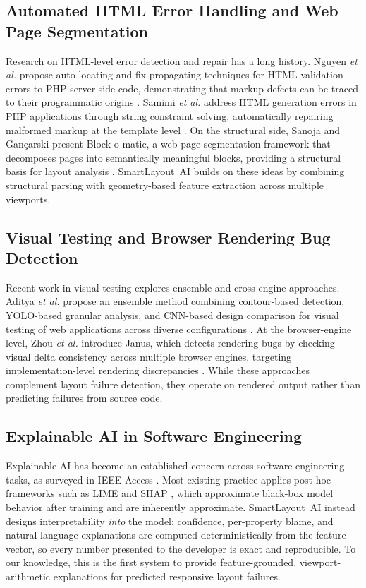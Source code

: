 \documentclass[conference]{IEEEtran}
\begin{document}
\subsection{Automated HTML Error Handling and Web Page Segmentation}
Research on HTML-level error detection and repair has a long history.
Nguyen \emph{et al.} propose auto-locating and fix-propagating
techniques for HTML validation errors to PHP server-side code,
demonstrating that markup defects can be traced to their programmatic
origins \cite{nguyen2011htmlauto}. Samimi \emph{et al.} address HTML
generation errors in PHP applications through string constraint
solving, automatically repairing malformed markup at the template level
\cite{samimi2012htmlrepair}. On the structural side, Sanoja and
Gan\c{c}arski present Block-o-matic, a web page segmentation framework
that decomposes pages into semantically meaningful blocks, providing a
structural basis for layout analysis
\cite{sanoja2014blockomatic}. SmartLayout~AI builds on these ideas by
combining structural parsing with geometry-based feature extraction
across multiple viewports.

\subsection{Visual Testing and Browser Rendering Bug Detection}
Recent work in visual testing explores ensemble and cross-engine
approaches. Aditya \emph{et al.} propose an ensemble method combining
contour-based detection, YOLO-based granular analysis, and CNN-based
design comparison for visual testing of web applications across diverse
configurations \cite{aditya2023ensemble}. At the browser-engine level,
Zhou \emph{et al.} introduce Janus, which detects rendering bugs by
checking visual delta consistency across multiple browser engines,
targeting implementation-level rendering discrepancies
\cite{zhou2025janus}. While these approaches complement layout failure
detection, they operate on rendered output rather than predicting
failures from source code.

\subsection{Explainable AI in Software Engineering}
Explainable AI has become an established concern across software
engineering tasks, as surveyed in IEEE Access \cite{khan2026xai_se}.
Most existing practice applies post-hoc frameworks such as LIME and
SHAP \cite{lime2016, shap2017}, which approximate black-box model
behavior after training and are inherently approximate. SmartLayout~AI
instead designs interpretability \textit{into} the model: confidence,
per-property blame, and natural-language explanations are computed
deterministically from the feature vector, so every number presented to
the developer is exact and reproducible. To our knowledge, this is the
first system to provide feature-grounded, viewport-arithmetic
explanations for predicted responsive layout failures.
\end{document}
